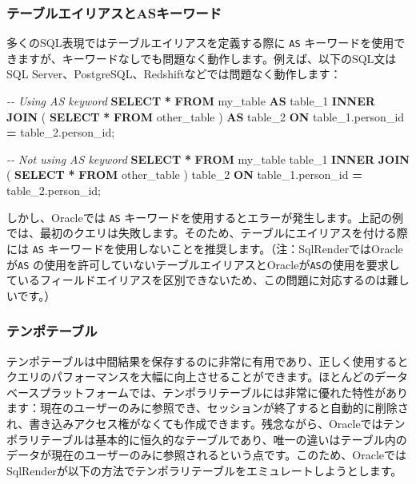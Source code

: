 \documentclass[
  11pt]{book}
\newenvironment{Shaded}{\begin{snugshade}}{\end{snugshade}}
\newcommand{\CommentTok}[1]{\textcolor[rgb]{0.56,0.35,0.01}{\textit{#1}}}
\newcommand{\KeywordTok}[1]{\textcolor[rgb]{0.13,0.29,0.53}{\textbf{#1}}}
\newcommand{\NormalTok}[1]{#1}
\newcommand{\OperatorTok}[1]{\textcolor[rgb]{0.81,0.36,0.00}{\textbf{#1}}}
\theoremstyle{definition}
\theoremstyle{definition}
\theoremstyle{definition}
\theoremstyle{definition}
\theoremstyle{remark}
\begin{document}
\subsubsection*{テーブルエイリアスとASキーワード}\label{ux30c6ux30fcux30d6ux30ebux30a8ux30a4ux30eaux30a2ux30b9ux3068asux30adux30fcux30efux30fcux30c9}

多くのSQL表現ではテーブルエイリアスを定義する際に \texttt{AS} キーワードを使用できますが、キーワードなしでも問題なく動作します。例えば、以下のSQL文はSQL Server、PostgreSQL、Redshiftなどでは問題なく動作します：

\begin{Shaded}
\begin{Highlighting}[]
\CommentTok{{-}{-} Using AS keyword}
\KeywordTok{SELECT} \OperatorTok{*}
\KeywordTok{FROM}\NormalTok{ my\_table }\KeywordTok{AS}\NormalTok{ table\_1}
\KeywordTok{INNER} \KeywordTok{JOIN}\NormalTok{ (}
  \KeywordTok{SELECT} \OperatorTok{*} \KeywordTok{FROM}\NormalTok{ other\_table}
\NormalTok{) }\KeywordTok{AS}\NormalTok{ table\_2}
\KeywordTok{ON}\NormalTok{ table\_1.person\_id }\OperatorTok{=}\NormalTok{ table\_2.person\_id;}

\CommentTok{{-}{-} Not using AS keyword}
\KeywordTok{SELECT} \OperatorTok{*}
\KeywordTok{FROM}\NormalTok{ my\_table table\_1}
\KeywordTok{INNER} \KeywordTok{JOIN}\NormalTok{ (}
  \KeywordTok{SELECT} \OperatorTok{*} \KeywordTok{FROM}\NormalTok{ other\_table}
\NormalTok{) table\_2}
\KeywordTok{ON}\NormalTok{ table\_1.person\_id }\OperatorTok{=}\NormalTok{ table\_2.person\_id;}
\end{Highlighting}
\end{Shaded}

しかし、Oracleでは \texttt{AS} キーワードを使用するとエラーが発生します。上記の例では、最初のクエリは失敗します。そのため、テーブルにエイリアスを付ける際には \texttt{AS} キーワードを使用しないことを推奨します。（注：SqlRenderではOracleが\texttt{AS} の使用を許可していないテーブルエイリアスとOracleが\texttt{AS}の使用を要求しているフィールドエイリアスを区別できないため、この問題に対応するのは難しいです。）

\subsubsection*{テンポテーブル}\label{ux30c6ux30f3ux30ddux30c6ux30fcux30d6ux30eb}

テンポテーブルは中間結果を保存するのに非常に有用であり、正しく使用するとクエリのパフォーマンスを大幅に向上させることができます。ほとんどのデータベースプラットフォームでは、テンポラリテーブルには非常に優れた特性があります：現在のユーザーのみに参照でき、セッションが終了すると自動的に削除され、書き込みアクセス権がなくても作成できます。残念ながら、Oracleではテンポラリテーブルは基本的に恒久的なテーブルであり、唯一の違いはテーブル内のデータが現在のユーザーのみに参照されるという点です。このため、OracleではSqlRenderが以下の方法でテンポラリテーブルをエミュレートしようとします。
\end{document}
